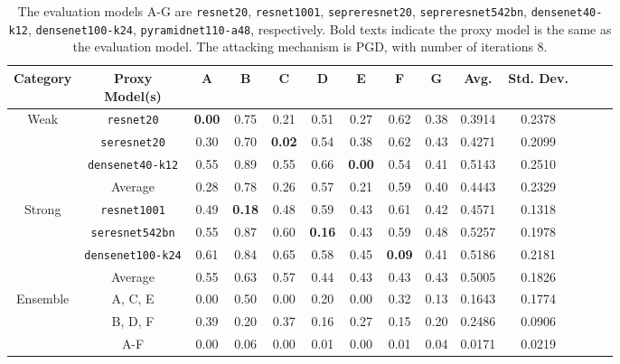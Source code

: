 \documentclass{article}
\begin{document}
\begin{table}
  \label{proxy-experiments}
  \centering
  \caption{
    The evaluation models A-G are \texttt{resnet20}, \texttt{resnet1001}, \texttt{sepreresnet20}, \texttt{sepreresnet542bn}, \texttt{densenet40-k12}, \texttt{densenet100-k24}, \texttt{pyramidnet110-a48}, respectively. Bold texts indicate the proxy model is the same as the evaluation model. The attacking mechanism is PGD, with number of iterations 8.
  }

  \begin{tabular}{cccccccccccccc}
    \toprule
    Category & \makecell{Proxy \\ Model(s)} & A & B & C & D & E & F & G & Avg. & Std. Dev. \\
    \midrule
    \multirow{4}{*}{Weak}   & \texttt{resnet20}         & \textbf{0.00} & 0.75 & 0.21 & 0.51 & 0.27 & 0.62 & 0.38 & 0.3914 & 0.2378 \\
                            & \texttt{seresnet20}       & 0.30 & 0.70 & \textbf{0.02} & 0.54 & 0.38 & 0.62 & 0.43 & 0.4271 & 0.2099 \\
                            & \texttt{densenet40-k12}   & 0.55 & 0.89 & 0.55 & 0.66 & \textbf{0.00} & 0.54 & 0.41 & 0.5143 & 0.2510 \\
                            & Average                   & 0.28 & 0.78 & 0.26 & 0.57 & 0.21 & 0.59 & 0.40 & 0.4443 & 0.2329 \\
    \midrule
    \multirow{4}{*}{Strong} & \texttt{resnet1001}       & 0.49 & \textbf{0.18} & 0.48 & 0.59 & 0.43 & 0.61 & 0.42 & 0.4571 & 0.1318 \\
                            & \texttt{seresnet542bn}    & 0.55 & 0.87 & 0.60 & \textbf{0.16} & 0.43 & 0.59 & 0.48 & 0.5257 & 0.1978 \\
                            & \texttt{densenet100-k24}  & 0.61 & 0.84 & 0.65 & 0.58 & 0.45 & \textbf{0.09} & 0.41 & 0.5186 & 0.2181 \\
                            & Average                   & 0.55 & 0.63 & 0.57 & 0.44 & 0.43 & 0.43 & 0.43 & 0.5005 & 0.1826 \\
    \midrule
    \multirow{3}{*}{Ensemble} & A, C, E                 & 0.00 & 0.50 & 0.00 & 0.20 & 0.00 & 0.32 & 0.13 & 0.1643 & 0.1774 \\
                              & B, D, F                 & 0.39 & 0.20 & 0.37 & 0.16 & 0.27 & 0.15 & 0.20 & 0.2486 & 0.0906 \\
                              & A-F                     & 0.00 & 0.06 & 0.00 & 0.01 & 0.00 & 0.01 & 0.04 & 0.0171 & 0.0219 \\
    \bottomrule
  \end{tabular}
\end{table}
\end{document}

